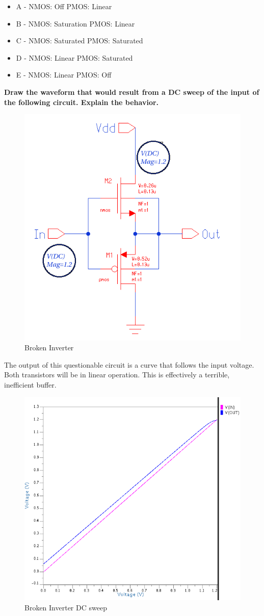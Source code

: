 \documentclass[11pt]{article}
\begin{document}
	\begin{itemize}
		\item A - NMOS: Off PMOS: Linear
		\item B - NMOS: Saturation PMOS: Linear
		\item C - NMOS: Saturated PMOS: Saturated
		\item D - NMOS: Linear PMOS: Saturated
		\item E - NMOS: Linear PMOS: Off
	\end{itemize}
	
	\textbf{Draw the waveform that would result from a DC sweep of the input of the following circuit.  Explain the behavior.}
	
	\begin{figure}[H]
		\centering
		\includegraphics[width=0.7\linewidth]{"Pictures/Bad Inverter"}
		\caption[]{Broken Inverter}
		\label{fig:bad-inverter}
	\end{figure}

	The output of this questionable circuit is a curve that follows the input voltage. Both transistors will be in linear operation. This is effectively a terrible, inefficient buffer. 

	\begin{figure}[H]
		\centering
		\includegraphics[width=0.9\linewidth]{"Pictures/Bad Inverter Waveform"}
		\caption[]{Broken Inverter DC sweep}
		\label{fig:bad-inverter-sweep}
	\end{figure}
\end{document}
